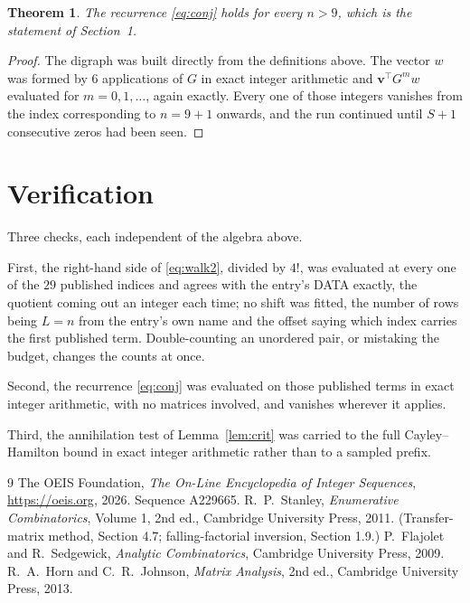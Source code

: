 \documentclass[11pt,a4paper]{article}
\theoremstyle{plain}
\newtheorem{theorem}{Theorem}
\theoremstyle{definition}
\begin{document}
\begin{theorem}
The recurrence \eqref{eq:conj} holds for every $n>9$, which is the statement of
Section~1.
\end{theorem}

\begin{proof}
The digraph was built directly from the definitions above. The vector $w$ was formed by
$6$ applications of $G$ in exact integer arithmetic and $\mathbf{v}^{\!\top}G^{m}w$
evaluated for $m=0,1,\dots$, again exactly. Every one of those integers vanishes from the
index corresponding to $n=9+1$ onwards, and the run continued until $S+1$ consecutive
zeros had been seen.
\end{proof}

\section{Verification}

Three checks, each independent of the algebra above.

First, the right-hand side of \eqref{eq:walk2}, divided by $4!$, was evaluated at every
one of the $29$ published indices and agrees with the entry's DATA exactly, the quotient
coming out an integer each time; no shift was fitted, the number of rows being $L=n$
from the entry's own name and the offset saying which index carries the first published term.
Double-counting an unordered pair, or mistaking the budget, changes the counts at once.

Second, the recurrence \eqref{eq:conj} was evaluated on those published terms in exact
integer arithmetic, with no matrices involved, and vanishes wherever it applies.

Third, the annihilation test of Lemma~\ref{lem:crit} was carried to the full
Cayley--Hamilton bound in exact integer arithmetic rather than to a sampled prefix.

\begin{thebibliography}{9}
 The OEIS Foundation, \emph{The On-Line Encyclopedia of Integer
Sequences}, \url{https://oeis.org}, 2026. Sequence A229665.
 R.~P.~Stanley, \emph{Enumerative Combinatorics}, Volume 1, 2nd ed.,
Cambridge University Press, 2011. (Transfer-matrix method, Section 4.7; falling-factorial
inversion, Section 1.9.)
 P.~Flajolet and R.~Sedgewick, \emph{Analytic Combinatorics}, Cambridge
University Press, 2009.
 R.~A.~Horn and C.~R.~Johnson, \emph{Matrix Analysis}, 2nd ed., Cambridge
University Press, 2013.
\end{thebibliography}
\end{document}
